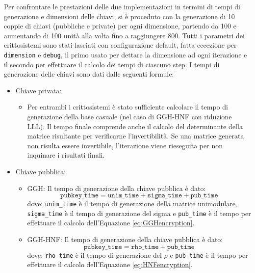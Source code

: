 Per confrontare le prestazioni delle due implementazioni in termini di tempi di generazione 
e dimensioni delle chiavi, si è proceduto con la generazione di 10 coppie di chiavi 
(pubbliche e private) per ogni dimensione, partendo da 100 e aumentando di 100 unità alla volta 
fino a raggiungere 800. Tutti i parametri dei crittosistemi sono stati lasciati con configurazione 
default, fatta eccezione per \texttt{dimension} e \texttt{debug}, il primo usato per 
dettare la dimensione ad ogni iterazione e il secondo per effettuare il calcolo dei tempi
di ciascuno step. I tempi di generazione delle chiavi sono dati dalle seguenti formule:
\begin{itemize}
    \item Chiave privata:
    \begin{itemize}
        \item Per entrambi i crittosistemi è stato sufficiente calcolare il tempo di 
        generazione della base casuale (nel caso di GGH-HNF con riduzione LLL). Il tempo
        finale comprende anche il calcolo del determinante della matrice risultante 
        per verificarne l'invertibilità. Se una matrice generata non risulta essere 
        invertibile, l'iterazione viene rieseguita per non inquinare i risultati finali. 
    \end{itemize}
    \item Chiave pubblica:
    \begin{itemize}
        \item GGH: Il tempo di generazione della chiave pubblica è dato:
        $$\texttt{pubkey\_time} = \texttt{unim\_time}+\texttt{sigma\_time}+\texttt{pub\_time}$$
        dove: \texttt{unim\_time} è il tempo di generazione della matrice unimodulare, 
        \texttt{sigma\_time} è il tempo di generazione del sigma e \texttt{pub\_time} è il 
        tempo per effettuare il calcolo dell'Equazione \ref{eq:GGHencryption}.
        \item GGH-HNF: Il tempo di generazione della chiave pubblica è dato:
        $$\texttt{pubkey\_time} = \texttt{rho\_time}+\texttt{pub\_time}$$
        dove: \texttt{rho\_time} è il tempo di generazione del $\rho$ e 
        \texttt{pub\_time} è il tempo per effettuare il calcolo dell'Equazione \ref{eq:HNFencryption}.
    \end{itemize} 
\end{itemize}

